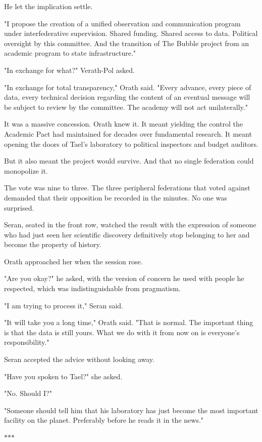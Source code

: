 \documentclass[11pt,a5paper,twoside]{book}
\begin{document}
He let the implication settle.

"I propose the creation of a unified observation and communication program under interfederative supervision. Shared funding. Shared access to data. Political oversight by this committee. And the transition of The Bubble project from an academic program to state infrastructure."

"In exchange for what?" Verath-Pol asked.

"In exchange for total transparency," Orath said. "Every advance, every piece of data, every technical decision regarding the content of an eventual message will be subject to review by the committee. The academy will not act unilaterally."

It was a massive concession. Orath knew it. It meant yielding the control the Academic Pact had maintained for decades over fundamental research. It meant opening the doors of Tael’s laboratory to political inspectors and budget auditors.

But it also meant the project would survive. And that no single federation could monopolize it.

The vote was nine to three. The three peripheral federations that voted against demanded that their opposition be recorded in the minutes. No one was surprised.

Seran, seated in the front row, watched the result with the expression of someone who had just seen her scientific discovery definitively stop belonging to her and become the property of history.

Orath approached her when the session rose.

"Are you okay?" he asked, with the version of concern he used with people he respected, which was indistinguishable from pragmatism.

"I am trying to process it," Seran said.

"It will take you a long time," Orath said. "That is normal. The important thing is that the data is still yours. What we do with it from now on is everyone's responsibility."

Seran accepted the advice without looking away.

"Have you spoken to Tael?" she asked.

"No. Should I?"

"Someone should tell him that his laboratory has just become the most important facility on the planet. Preferably before he reads it in the news."

\vspace{1.5em}
\begin{center}$\ast$\quad$\ast$\quad$\ast$\end{center}
\vspace{1.5em}
\end{document}
